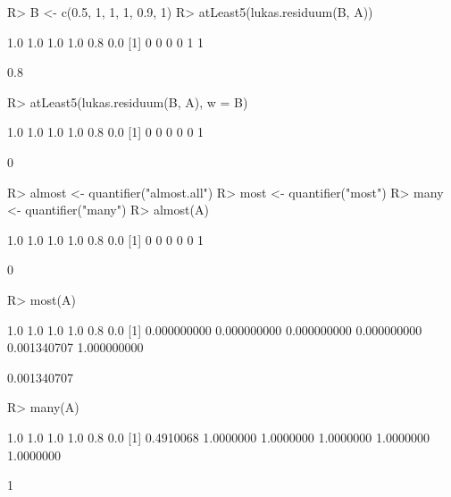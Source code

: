 \documentclass{article}\usepackage[]{graphicx}\usepackage[]{color}
\begin{document}
\begin{Schunk}
% --begin: "quant3"
\begin{Sinput}
R> B <- c(0.5, 1, 1, 1, 0.9, 1)
R> atLeast5(lukas.residuum(B, A))
\end{Sinput}
\begin{Soutput}
[1] 1.0 1.0 1.0 1.0 0.8 0.0
[1] 0 0 0 0 1 1
\end{Soutput}
\begin{Soutput}
[1] 0.8
\end{Soutput}
%
% --end: "quant3"
\end{Schunk}

\begin{Schunk}
% --begin: "quant4"
\begin{Sinput}
R> atLeast5(lukas.residuum(B, A), w = B)
\end{Sinput}
\begin{Soutput}
[1] 1.0 1.0 1.0 1.0 0.8 0.0
[1] 0 0 0 0 0 1
\end{Soutput}
\begin{Soutput}
[1] 0
\end{Soutput}
%
% --end: "quant4"
\end{Schunk}

\begin{Schunk}
% --begin: "quant5"
\begin{Sinput}
R> almost <- quantifier("almost.all")
R> most <- quantifier("most")
R> many <- quantifier("many")
R> almost(A)
\end{Sinput}
\begin{Soutput}
[1] 1.0 1.0 1.0 1.0 0.8 0.0
[1] 0 0 0 0 0 1
\end{Soutput}
\begin{Soutput}
[1] 0
\end{Soutput}
\begin{Sinput}
R> most(A)
\end{Sinput}
\begin{Soutput}
[1] 1.0 1.0 1.0 1.0 0.8 0.0
[1] 0.000000000 0.000000000 0.000000000 0.000000000 0.001340707 1.000000000
\end{Soutput}
\begin{Soutput}
[1] 0.001340707
\end{Soutput}
\begin{Sinput}
R> many(A)
\end{Sinput}
\begin{Soutput}
[1] 1.0 1.0 1.0 1.0 0.8 0.0
[1] 0.4910068 1.0000000 1.0000000 1.0000000 1.0000000 1.0000000
\end{Soutput}
\begin{Soutput}
[1] 1
\end{Soutput}
%
% --end: "quant5"
\end{Schunk}
\end{document}
